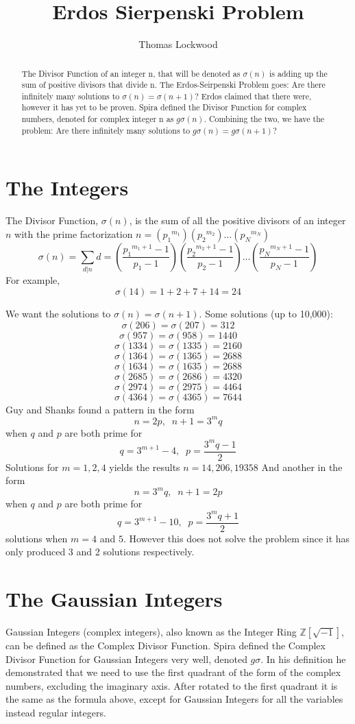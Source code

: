 \documentclass[12pt]{amsart}
\title{Erdos Sierpenski Problem}
\author{Thomas Lockwood}
\begin{document}
\maketitle
\thispagestyle{empty}

\begin{abstract}
The Divisor Function of an integer n, that will be denoted as $\sigma(n)$ is adding up the sum of positive divisors that divide n. The Erdos-Seirpenski Problem goes: Are there infinitely many solutions to $\sigma(n) = \sigma(n+1)$? Erdos claimed that there were, however it has yet to be proven. Spira defined the Divisor Function for complex numbers, denoted for complex integer n as $g\sigma(n)$. Combining the two, we have the problem: Are there infinitely many solutions to $g\sigma(n) = g\sigma(n+1)$?
\end{abstract}

\section{The Integers}
The Divisor Function, $\sigma(n)$, is the sum of all the positive divisors of an integer $n$ with the prime factorization $n = ({p_1}^{m_1})({p_2}^{m_2})...({p_N}^{m_N})$ $$\sigma(n) = \sum_{d|{n}}d = (\frac{{p_1}^{m_1+1} - 1} {{p_1} - 1}) (\frac{{p_2}^{m_2+1} - 1}{{p_2} - 1})... (\frac{{p_N}^{m_N+1} - 1}{{p_N} - 1}) $$ For example, $$\sigma(14) = 1 + 2 + 7 + 14 = 24$$

We want the solutions to $\sigma(n) = \sigma(n+1)$. Some solutions (up to 10,000):
\\
$$\sigma(206) = \sigma(207) = 312$$
$$\sigma(957) = \sigma(958) = 1440$$
$$\sigma(1334) = \sigma(1335) = 2160$$
$$\sigma(1364) = \sigma(1365) = 2688$$
$$\sigma(1634) = \sigma(1635) = 2688$$
$$\sigma(2685) = \sigma(2686) = 4320$$
$$\sigma(2974) = \sigma(2975) = 4464$$
$$\sigma(4364) = \sigma(4365) = 7644$$
Guy and Shanks found a pattern in the form $$n = 2p,\; \; n + 1 = 3^{m}q$$ when $q$ and $p$ are both prime for $$q = 3^{m+1} - 4, \; \; p=\frac{3^{m}q-1} {2}$$ Solutions for $m = 1, 2, 4$ yields the results $n = 14, 206, 19358$
And another in the form $$n = 3^{m}q, \; \; n+1 = 2p$$ when $q$ and $p$ are both prime for $$q = 3^{m+1} - 10, \; \; p = \frac{3^{m}q + 1} {2}$$  solutions when $m = 4$ and $5$. However this does not solve the problem since it has only produced 3 and 2 solutions respectively.

\section{The Gaussian Integers}
Gaussian Integers (complex integers), also known as the Integer Ring $\mathds{Z}[\sqrt{-1}]$, can be defined as the Complex Divisor Function. Spira defined the Complex Divisor Function for Gaussian Integers very well, denoted $g\sigma$. In his definition he demonstrated that we need to use the first quadrant of the form of the complex numbers, excluding the imaginary axis. After rotated to the first quadrant it is the same as the formula above, except for Gaussian Integers for all the variables instead regular integers.
\end{document}
